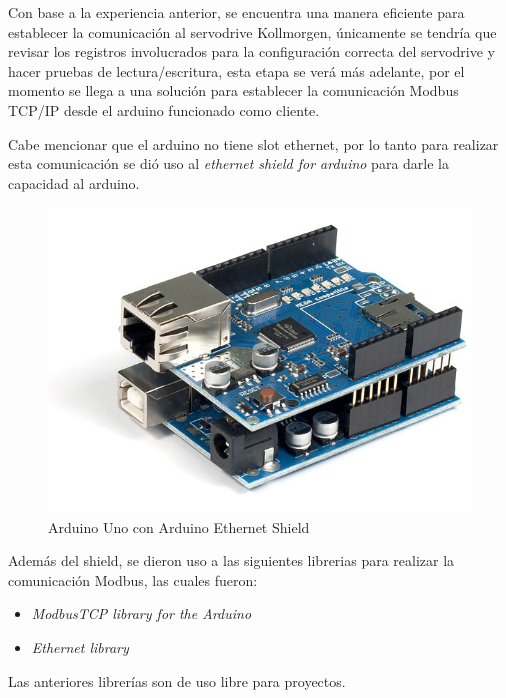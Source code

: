 \documentclass[12pt,titlepage]{article}
\begin{document}
Con base a la experiencia anterior, se encuentra una manera eficiente para establecer la comunicación al servodrive Kollmorgen, únicamente se tendría que revisar los registros involucrados para la configuración correcta del servodrive y hacer pruebas de lectura/escritura, esta etapa se verá más adelante, por el momento se llega a una solución para establecer la comunicación Modbus TCP/IP desde el arduino funcionado como cliente. \\

\newpage

Cabe mencionar que el arduino no tiene slot ethernet, por lo tanto para realizar esta comunicación se dió uso al \textit{ethernet shield  for arduino} para darle la capacidad al arduino.\\ 

\begin{figure}[htbp]
\hspace*{4.2cm} 
\includegraphics[scale=0.39]{Arduino_ethernet}
\caption{Arduino Uno con Arduino Ethernet Shield}
\end{figure}

Además del shield, se dieron uso a las siguientes librerias para realizar la comunicación Modbus, las cuales fueron:\\

\begin{itemize}
\item \textit{ModbusTCP library for the Arduino} 
\item \textit{Ethernet library}
\end{itemize}

Las anteriores librerías son de uso libre para proyectos. \\ 
\end{document}
